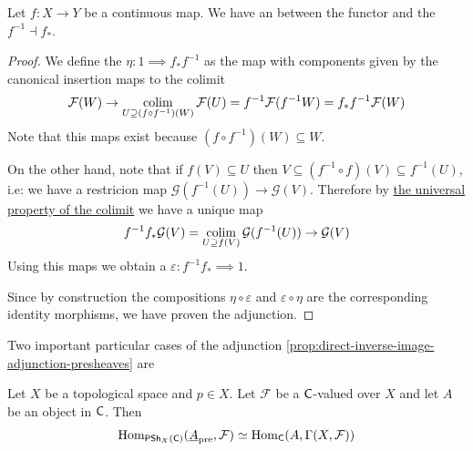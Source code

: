 \documentclass[../main.tex]{subfiles}
\begin{document}
\begin{proposition} \label{prop:direct-inverse-image-adjunction-presheaves}
  Let \(f: X \to Y\) be a continuous map.
  We have an  between the  functor and the  \(f^{-1} \dashv f_{\ast}\).
\end{proposition}
\begin{proof}
  We define the  \(\eta: 1 \implies f_{\ast}f^{-1}\) as the map with components given by the canonical insertion maps to the colimit
  \begin{align*}
    \mathcal{F}(W) \to \operatorname*{colim}_{U \supseteq (f \circ f^{-1})(W)} \mathcal{F}(U) = f^{-1}\mathcal{F}(f^{-1}W) = f_{\ast}f^{-1}\mathcal{F}(W)
  \end{align*}
  Note that this maps exist because \((f \circ f^{-1})(W) \subseteq W\).

  On the other hand, note that if \(f(V) \subseteq U\) then \(V \subseteq (f^{-1} \circ f)(V) \subseteq f^{-1}(U)\), i.e: we have a restricion map \(\mathcal{G}(f^{-1}(U)) \to \mathcal{G}(V)\).
  Therefore by \hyperref[def:categorical-colimit]{the universal property of the colimit} we have a unique map
  \begin{align*}
    f^{-1}f_{\ast}\mathcal{G}(V) = \operatorname*{colim}_{U \supseteq f(V)} \mathcal{G}(f^{-1}(U)) \to \mathcal{G}(V)
  \end{align*}
  Using this maps we obtain a  \(\varepsilon: f^{-1}f_{\ast} \implies 1\).

  Since by construction the compositions \(\eta \circ \varepsilon\) and \(\varepsilon \circ \eta\) are the corresponding identity morphisms, we have proven the adjunction.
\end{proof}

Two important particular cases of the adjunction \autoref{prop:direct-inverse-image-adjunction-presheaves} are
\begin{corollary} \label{cor:constant-global-adjunction-presheaf}
  Let \(X\) be a topological space and \(p \in X\).
  Let \(\mathcal{F}\) be a \(\mathsf{C}\)-valued  over \(X\) and let \(A\) be an object in \(\mathsf{C}\).
  Then
  \begin{equation*}
    \operatorname{Hom}_{\mathsf{PSh}_{X}(\mathsf{C})}(\underline{A}_{\operatorname*{pre}}, \mathcal{F}) \simeq \operatorname{Hom}_{\mathsf{C}}(A, \Gamma(X, \mathcal{F}))
  \end{equation*}
\end{corollary}
\end{document}
